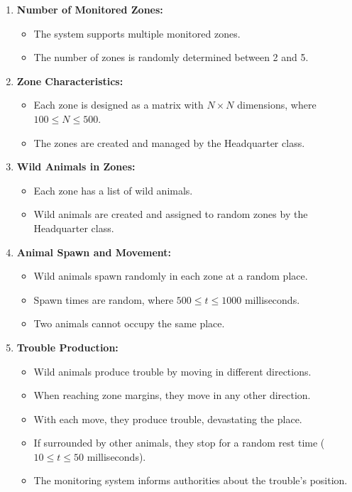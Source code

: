 \documentclass{article}
\begin{document}
\begin{enumerate}
    \item \textbf{Number of Monitored Zones:}
    \begin{itemize}
        \item The system supports multiple monitored zones.
        \item The number of zones is randomly determined between 2 and 5.
    \end{itemize}
    \item \textbf{Zone Characteristics:}
    \begin{itemize}
        \item Each zone is designed as a matrix with $N \times N$ dimensions, where $100 \leq N \leq 500$.
        \item The zones are created and managed by the Headquarter class.
    \end{itemize}
    \item \textbf{Wild Animals in Zones:}
    \begin{itemize}
        \item Each zone has a list of wild animals.
        \item Wild animals are created and assigned to random zones by the Headquarter class.
    \end{itemize}
    \item \textbf{Animal Spawn and Movement:}
    \begin{itemize}
        \item Wild animals spawn randomly in each zone at a random place.
        \item Spawn times are random, where $500 \leq t \leq 1000$ milliseconds.
        \item Two animals cannot occupy the same place.
    \end{itemize}
    \item \textbf{Trouble Production:}
    \begin{itemize}
        \item Wild animals produce trouble by moving in different directions.
        \item When reaching zone margins, they move in any other direction.
        \item With each move, they produce trouble, devastating the place.
        \item If surrounded by other animals, they stop for a random rest time ($10 \leq t \leq 50$ milliseconds).
        \item The monitoring system informs authorities about the trouble's position.

\end{itemize}
\end{enumerate}
\end{document}
